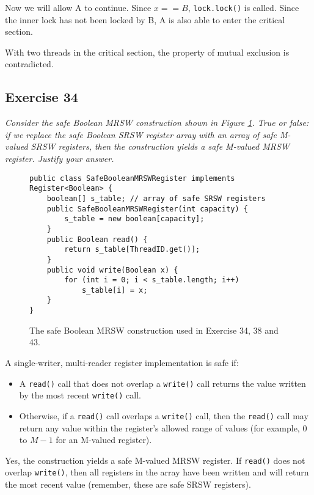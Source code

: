 \documentclass[a4paper,10pt]{article}
\begin{document}
Now we will allow A to continue. Since $x == B$, \lstinline|lock.lock()| is called.
Since the inner lock has not been locked by B, A is also able to enter the critical section.

With two threads in the critical section, the property of mutual exclusion is
contradicted.


\subsection{Exercise 34}

\emph{Consider the safe Boolean MRSW construction shown in Figure \ref{fig:safebooleanmrsw}.
True or false: if we replace the safe Boolean SRSW register array with an array
of safe M-valued SRSW registers, then the construction yields a safe M-valued
MRSW register. Justify your answer.}

\vspace{3mm}

\begin{figure}
\begin{lstlisting}
public class SafeBooleanMRSWRegister implements Register<Boolean> {
    boolean[] s_table; // array of safe SRSW registers
    public SafeBooleanMRSWRegister(int capacity) {
        s_table = new boolean[capacity];
    }
    public Boolean read() {
        return s_table[ThreadID.get()];
    }
    public void write(Boolean x) {
        for (int i = 0; i < s_table.length; i++)
            s_table[i] = x;
    }
}
\end{lstlisting}
\caption{The safe Boolean MRSW construction used in Exercise 34, 38 and 43.}
\label{fig:safebooleanmrsw}
\end{figure}

A single-writer, multi-reader register implementation is safe if: 

\begin{itemize}
\item A \lstinline|read()| call that does not overlap a \lstinline|write()| call returns the value written by
      the most recent \lstinline|write()| call.
\item Otherwise, if a \lstinline|read()| call overlaps a \lstinline|write()| call, then the \lstinline|read()| call may
      return any value within the register’s allowed range of values (for example,
      $0$ to $M - 1$ for an M-valued register).
\end{itemize}

Yes, the construction yields a safe M-valued MRSW register. If \lstinline|read()|
does not overlap \lstinline|write()|, then all registers in the array have been written
and will return the most recent value (remember, these are safe SRSW registers).
\end{document}
